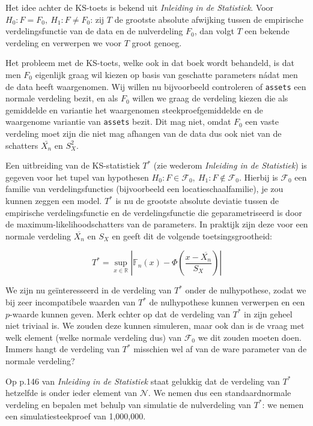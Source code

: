 \documentclass[a4paper]{report}
\begin{document}
  Het idee achter de KS-toets is bekend uit \emph{Inleiding in de Statistiek}. Voor $H_0: F = F_0, \ H_1: F \neq F_0$: zij $T$ de grootste absolute afwijking tussen de empirische verdelingsfunctie van de data en de nulverdeling $F_0$, dan volgt $T$ een bekende verdeling en verwerpen we voor $T$ groot genoeg.
  
  Het probleem met de KS-toets, welke ook in dat boek wordt behandeld, is dat men $F_0$ eigenlijk graag wil kiezen op basis van geschatte parameters n\' adat men de data heeft waargenomen. Wij willen nu bijvoorbeeld controleren of \verb!assets! een normale verdeling bezit, en als $F_0$ willen we graag de verdeling kiezen die als gemiddelde en variantie het waargenomen steekproefgemiddelde en de waargenome variantie van \verb!assets! bezit. Dit mag niet, omdat $F_0$ een vaste verdeling moet zijn die niet mag afhangen van de data dus ook niet van de schatters $\bar{X_n}$ en $S^2_X$.
  
  Een uitbreiding van de KS-statistiek $T^*$ (zie wederom \emph{Inleiding in de Statistiek}) is gegeven voor het tupel van hypothesen $H_0: F \in \mathcal{F}_0, \ H_1: F \not \in \mathcal{F}_0$. Hierbij is $\mathcal{F}_0$ een familie van verdelingsfuncties (bijvoorbeeld een locatieschaalfamilie), je zou kunnen zeggen een model. $T^*$ is nu de grootste absolute deviatie tussen de empirische verdelingsfunctie en de verdelingsfunctie die geparametriseerd is door de maximum-likelihoodschatters van de parameters. In praktijk zijn deze voor een normale verdeling $\overline{X_n}$ en $S_X$ en geeft dit de volgende toetsingsgrootheid:

  \begin{equation}
    T^* = \sup_{x\in \mathbb{R}} | \mathbb{F}_n(x) - \Phi(\frac{x-\overline{X_n}}{S_X})|
  \end{equation}  	
	
   We zijn nu ge\"interesseerd in de verdeling van $T^*$ onder de nulhypothese, zodat we bij zeer incompatibele waarden van $T^*$ de nulhypothese kunnen verwerpen en een $p$-waarde kunnen geven. Merk echter op dat de verdeling van $T^*$ in zijn geheel niet triviaal is. We zouden deze kunnen simuleren, maar ook dan is de vraag met welk element (welke normale verdeling dus) van $\mathcal{F}_0$ we dit zouden moeten doen. Immers hangt de verdeling van $T^*$ misschien wel af van de ware parameter van de normale verdeling? 
   
   Op p.146 van \emph{Inleiding in de Statistiek} staat gelukkig dat de verdeling van $T^*$ hetzelfde is onder ieder element van $\mathcal{N}$. We nemen dus een standaardnormale verdeling en bepalen met behulp van simulatie de nulverdeling van $T^*$: we nemen een simulatiesteekproef van 1,000,000.
\end{document}
